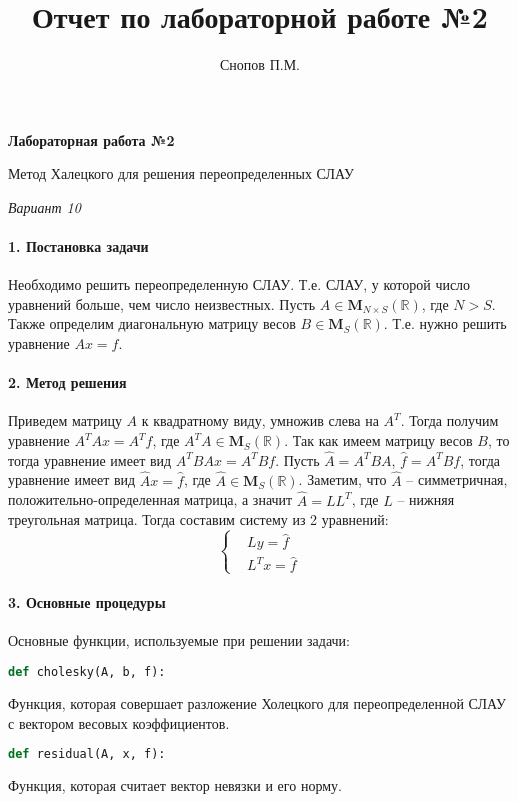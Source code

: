 \documentclass[11pt,a4paper]{report}
\begin{document}
\title{Отчет по лабораторной работе №2}

\author{Снопов П.М.}
\thispagestyle{titlepagestyle}
\maketitle
\begin{center}
	\textbf{Лабораторная работа №2}
	
	Метод Халецкого для решения переопределенных СЛАУ
	
	\textit{Вариант 10}
\end{center}

\paragraph{1. Постановка задачи}
Необходимо решить переопределенную СЛАУ. Т.е. СЛАУ, у которой число уравнений больше, чем число неизвестных. Пусть $A \in \boldsymbol{M}_{N \times S}(\mathbb{R}) $, где $N>S$. Также определим диагональную матрицу весов $B \in \boldsymbol{M}_{S}(\mathbb{R})$.
\newline
Т.е. нужно решить уравнение $Ax=f$.

\paragraph{2. Метод решения}
Приведем матрицу $A$ к квадратному виду, умножив слева на $A^T$. Тогда получим уравнение $A^TAx=A^Tf$, где $A^TA \in \boldsymbol{M}_{S}(\mathbb{R})$. Так как имеем матрицу весов $B$, то тогда уравнение имеет вид $A^TBAx=A^TBf$. Пусть $\hat{A} = A^TBA$, $\hat{f} = A^TBf$, тогда уравнение имеет вид $\hat{A}x = \hat{f}$, где $\hat{A} \in \boldsymbol{M}_{S}(\mathbb{R})$.
\newline
Заметим, что $\hat{A}$ -- симметричная, положительно-определенная матрица, а значит $\hat{A} = LL^T$, где $L$ -- нижняя треугольная матрица. Тогда составим систему из 2 уравнений:
\[
\left\{\begin{aligned}
	&Ly    = \hat{f}\\
	&L^Tx = \hat{f}
\end{aligned}\right.
\]

\paragraph{3. Основные процедуры}
Основные функции, используемые при решении задачи:


\begin{lstlisting}[language=Python]
	def cholesky(A, b, f):
\end{lstlisting}
Функция, которая совершает разложение Холецкого для переопределенной СЛАУ с вектором весовых коэффициентов.
\begin{lstlisting}[language=Python]
	def residual(A, x, f):
\end{lstlisting}
Функция, которая считает вектор невязки и его норму.
\end{document}
